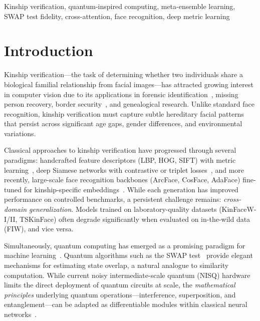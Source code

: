 \documentclass[journal,12pt]{IEEEtran}
\begin{document}
\begin{IEEEkeywords}
Kinship verification, quantum-inspired computing, meta-ensemble learning,
SWAP test fidelity, cross-attention, face recognition, deep metric learning
\end{IEEEkeywords}

\section{Introduction}
\label{sec:introduction}

Kinship verification—the task of determining whether two individuals share
a biological familial relationship from facial images—has attracted
growing interest in computer vision due to its applications in forensic
identification~\cite{lu2014kinship}, missing person recovery, border
security~\cite{robinson2018visual}, and genealogical research. Unlike
standard face recognition, kinship verification must capture subtle
hereditary facial patterns that persist across significant age gaps,
gender differences, and environmental variations.

Classical approaches to kinship verification have progressed through
several paradigms: handcrafted feature descriptors (LBP, HOG, SIFT) with
metric learning~\cite{lu2014kinship,yan2014discriminative}, deep Siamese
networks with contrastive or triplet losses~\cite{zhang2017kinship,li2019kinship},
and more recently, large-scale face recognition backbones (ArcFace, CosFace,
AdaFace) fine-tuned for kinship-specific embeddings~\cite{liang2021attention}.
While each generation has improved performance on controlled benchmarks,
a persistent challenge remains: \emph{cross-domain generalization}.
Models trained on laboratory-quality datasets (KinFaceW-I/II, TSKinFace)
often degrade significantly when evaluated on in-the-wild data (FIW),
and vice versa.

Simultaneously, quantum computing has emerged as a promising paradigm for
machine learning~\cite{biamonte2017quantum,schuld2019quantum}. Quantum
algorithms such as the SWAP test~\cite{buhrman2001quantum} provide elegant
mechanisms for estimating state overlap, a natural analogue to similarity
computation. While current noisy intermediate-scale quantum (NISQ) hardware
limits the direct deployment of quantum circuits at scale, the
\emph{mathematical principles} underlying quantum operations—interference,
superposition, and entanglement—can be adapted as differentiable modules
within classical neural networks~\cite{mari2020transfer,henderson2020quanvolutional}.
\end{document}
